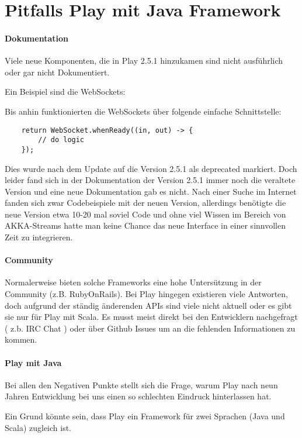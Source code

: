 \chapter{Pitfalls Play mit Java Framework}
\label{ch:play_pitfalls}

\subsubsection{Dokumentation}

Viele neue Komponenten, die in Play 2.5.1 hinzukamen sind nicht ausführlich oder gar nicht Dokumentiert.

Ein Beispiel sind die WebSockets:

Bis anhin funktionierten die WebSockets über folgende einfache Schnittstelle:
\begin{lstlisting}
    return WebSocket.whenReady((in, out) -> {
        // do logic
    });
\end{lstlisting}

Dies wurde nach dem Update auf die Version 2.5.1 als deprecated markiert. Doch leider fand sich in der Dokumentation der Version 2.5.1 immer noch die veraltete Version und eine neue Dokumentation gab es nicht. Nach einer Suche im Internet fanden sich zwar Codebeispiele mit der neuen Version, allerdings benötigte die neue Version etwa 10-20 mal soviel Code und ohne viel Wissen im Bereich von AKKA-Streams hatte man keine Chance das neue Interface in einer sinnvollen Zeit zu integrieren.

\subsubsection{Community}
Normalerweise bieten solche Frameworks eine hohe Untersützung in der Community (z.B. RubyOnRails). Bei Play hingegen existieren viele Antworten, doch aufgrund der ständig änderenden APIs sind viele nicht aktuell oder es gibt sie nur für Play mit Scala. 
Es musst meist direkt bei den Entwicklern nachgefragt ( z.b. IRC Chat ) oder über Github Issues \cite{github-ticket} um an die fehlenden Informationen zu kommen.


\subsubsection{Play mit Java}
Bei allen den Negativen Punkte stellt sich die Frage, warum Play nach neun Jahren Entwicklung bei uns einen so schlechten Eindruck hinterlassen hat. 

Ein Grund könnte sein, dass Play ein Framework für zwei Sprachen (Java und Scala) zugleich ist. 